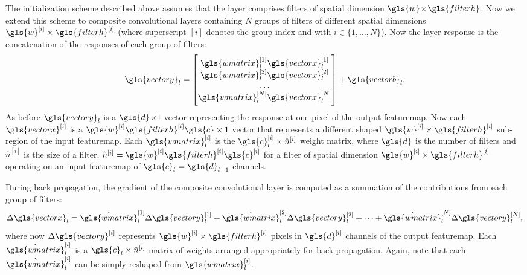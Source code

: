 \documentclass[thesis]{subfiles}
\begin{document}
    The initialization scheme described above assumes that the layer comprises filters of spatial dimension $\gls{w}$$\times$$\gls{filterh}$. Now we extend this scheme to composite convolutional layers containing $N$ groups of filters of different spatial dimensions $\gls{w}^{[i]} \times \gls{filterh}^{[i]}$ (where superscript $[i]$ denotes the group index and with $i\in \{1,\dots,N\}$). Now the layer response is the concatenation of the responses of each group of filters:
    \begin{equation}
    \gls{vectory}_l =\begin{bmatrix}\gls{wmatrix}_l^{[1]} \gls{vectorx}_l^{[1]} \\ \gls{wmatrix}_l^{[2]} \gls{vectorx}_l^{[2]} \\ \dots \\ \gls{wmatrix}_l^{[N]} \gls{vectorx}_l^{[N]} \end{bmatrix} + \gls{vectorb}_l.
    \end{equation}
    As before $\gls{vectory}_l$ is a $\gls{d}$$\times$$1$ vector representing the response at one pixel of the output \gls{featuremap}. Now each ${\gls{vectorx}}^{[i]}$ is a $\gls{w}^{[i]} \gls{filterh}^{[i]} \gls{c} \times 1$ vector that represents a different shaped $\gls{w}^{[i]} \times \gls{filterh}^{[i]}$ sub-region of the input \gls{featuremap}. Each $\gls{wmatrix}_l^{[i]}$ is the $\gls{c}_l^{[i]}\times \hat{n}^{[i]}$ weight matrix, where $\gls{d}$ is the number of filters and $\hat{n}^{[i]}$ is the size of a filter, \ie $\hat{n}^{[i]} = \gls{w}^{[i]} \gls{filterh}^{[i]} \gls{c}^{[i]}$ for a filter of spatial dimension $\gls{w}^{[i]} \times \gls{filterh}^{[i]}$ operating on an input \gls{featuremap} of $\gls{c}_l = \gls{d}_{l-1}$ channels.
    
    During back propagation, the gradient of the composite convolutional layer is computed as a summation of the contributions from each group of filters:
    \begin{equation}
    \Delta \gls{vectorx}_l = \hat{\gls{wmatrix}}_l^{[1]} \Delta \gls{vectory}_l^{[1]} +  \hat{\gls{wmatrix}}_l^{[2]} \Delta \gls{vectory}_l^{[2]} + \cdots+  \hat{\gls{wmatrix}}_l^{[N]} \Delta \gls{vectory}_l^{[N]},
    \label{eq:back_prop_gradient_composite}
    \end{equation}
    where now $\Delta \gls{vectory}^{[i]}$ represents $\gls{w}^{[i]} \times \gls{filterh}^{[i]}$ pixels in $\gls{d}^{[i]}$ channels of the output \gls{featuremap}. Each $\hat{\gls{wmatrix}}_l^{[i]}$ is a $\gls{c}_l \times \hat{n}^{[i]}$ matrix of weights arranged appropriately for back propagation. Again, note that each $\hat{\gls{wmatrix}}_l^{[i]}$ can be simply reshaped from $\gls{wmatrix}_l^{[i]}$.
    
\end{document}
